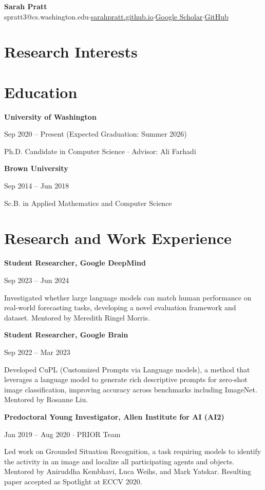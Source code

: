 \documentclass[11pt,letterpaper]{article}
\newcommand{\entry}[2]{%
    \hspace{12pt}\parbox{\dimexpr\textwidth-12pt}{%
        {\bfseries\color{darktext} #1}\par\vspace{1pt}%
        {\small\color{gray} #2}%
    }\par\vspace{1pt}%
}
\newcommand{\entrydesc}[1]{%
    \hspace{12pt}\parbox{\dimexpr\textwidth-12pt}{%
        {\small\color{darktext} #1}%
    }\par\vspace{8pt}%
}
\begin{document}
\begin{center}
    {\LARGE\bfseries\color{darktext} Sarah Pratt}\\[3pt]
    {\small\color{gray} spratt3@cs.washington.edu\enspace$\cdot$\enspace\href{https://sarahpratt.github.io}{sarahpratt.github.io}\enspace$\cdot$\enspace\href{https://scholar.google.com/citations?user=cNXj4QwAAAAJ}{Google Scholar}\enspace$\cdot$\enspace\href{https://github.com/sarahpratt}{GitHub}}
\end{center}
\vspace{-2pt}

\section*{Research Interests}

\hspace{12pt}{\small Machine Learning, Computer Vision, Language Models, Cross-model Learning}

\section*{Education}

\entry{University of Washington}{Sep 2020 -- Present (Expected Graduation: Summer 2026)}
\entrydesc{Ph.D. Candidate in Computer Science $\cdot$ Advisor: Ali Farhadi}

\entry{Brown University}{Sep 2014 -- Jun 2018}
\entrydesc{Sc.B. in Applied Mathematics and Computer Science}

\section*{Research and Work Experience}

\entry{Student Researcher, Google DeepMind}{Sep 2023 -- Jun 2024}
\entrydesc{Investigated whether large language models can match human performance on real-world forecasting tasks, developing a novel evaluation framework and dataset. Mentored by Meredith Ringel Morris.}

\entry{Student Researcher, Google Brain}{Sep 2022 -- Mar 2023}
\entrydesc{Developed CuPL (Customized Prompts via Language models), a method that leverages a language model to generate rich descriptive prompts for zero-shot image classification, improving accuracy across benchmarks including ImageNet. Mentored by Rosanne Liu.}

\entry{Predoctoral Young Investigator, Allen Institute for AI (AI2)}{Jan 2019 -- Aug 2020 $\cdot$ PRIOR Team}
\entrydesc{Led work on Grounded Situation Recognition, a task requiring models to identify the activity in an image and localize all participating agents and objects. Mentored by Aniruddha Kembhavi, Luca Weihs, and Mark Yatskar. Resulting paper accepted as Spotlight at ECCV 2020.}
\end{document}
